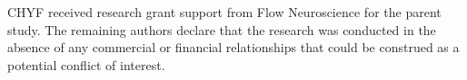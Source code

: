 CHYF received research grant support from Flow Neuroscience for the parent study. The remaining authors declare that the research was conducted in the absence of any commercial or financial relationships that could be construed as a potential conflict of interest.
